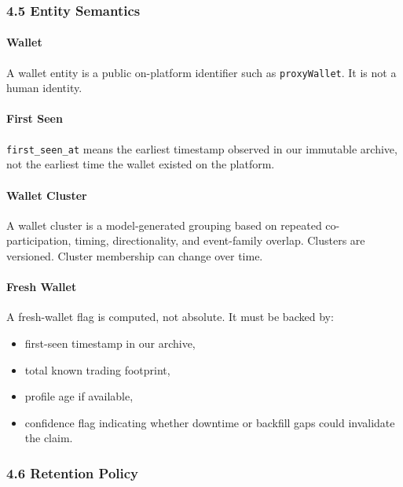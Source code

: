 \documentclass[
]{article}
\providecommand{\tightlist}{%
  \setlength{\itemsep}{0pt}\setlength{\parskip}{0pt}}
\begin{document}
\subsubsection{4.5 Entity Semantics}\label{45-entity-semantics}

\paragraph{Wallet}\label{wallet}

A wallet entity is a public on-platform identifier such as
\texttt{proxyWallet}. It is not a human identity.

\paragraph{First Seen}\label{first-seen}

\texttt{first\_seen\_at} means the earliest timestamp observed in our
immutable archive, not the earliest time the wallet existed on the
platform.

\paragraph{Wallet Cluster}\label{wallet-cluster}

A wallet cluster is a model-generated grouping based on repeated
co-participation, timing, directionality, and event-family overlap.
Clusters are versioned. Cluster membership can change over time.

\paragraph{Fresh Wallet}\label{fresh-wallet}

A fresh-wallet flag is computed, not absolute. It must be backed by:

\begin{itemize}
\tightlist
\item
  first-seen timestamp in our archive,
\item
  total known trading footprint,
\item
  profile age if available,
\item
  confidence flag indicating whether downtime or backfill gaps could
  invalidate the claim.
\end{itemize}

\subsubsection{4.6 Retention Policy}\label{46-retention-policy}
\end{document}
